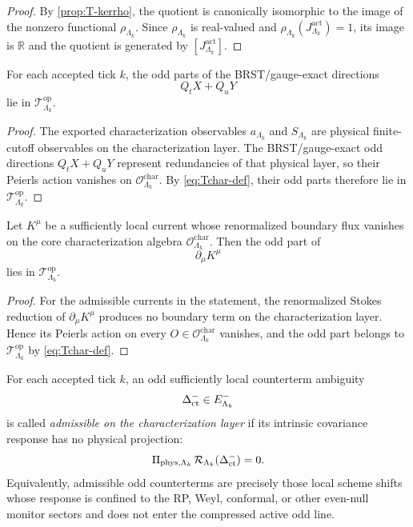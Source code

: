 \documentclass[11pt]{article}
\begin{document}
\begin{proof}
By \cref{prop:T-kerrho}, the quotient is canonically isomorphic to the image of the nonzero
functional \(\rho_{\Lambda_k}\). Since \(\rho_{\Lambda_k}\) is real-valued and
\(\rho_{\Lambda_k}(J^{\mathrm{act}}_{\Lambda_k})=1\), its image is \(\mathbb R\) and the quotient
is generated by \([J^{\mathrm{act}}_{\Lambda_k}]\).
\end{proof}

\begin{proposition}
\label{prop:ambiguity-brst-char}
For each accepted tick \(k\), the odd parts of the BRST/gauge-exact directions
\[
Q_tX+Q_uY
\]
lie in \(\mathcal T^{\mathrm{op}}_{\Lambda_k}\).
\end{proposition}

\begin{proof}
The exported characterization observables \(a_{\Lambda_k}\) and \(S_{\Lambda_k}\) are physical
finite-cutoff observables on the characterization layer. The BRST/gauge-exact odd directions
\(Q_tX+Q_uY\) represent redundancies of that physical layer, so their Peierls action vanishes on
\(\mathcal O^{\mathrm{char}}_{\Lambda_k}\). By \eqref{eq:Tchar-def}, their odd parts therefore lie
in \(\mathcal T^{\mathrm{op}}_{\Lambda_k}\).
\end{proof}

\begin{proposition}
\label{prop:ambiguity-div-char}
Let \(K^\mu\) be a sufficiently local current whose renormalized boundary flux vanishes on the core
characterization algebra \(\mathcal O^{\mathrm{char}}_{\Lambda_k}\). Then the odd part of
\[
\partial_\mu K^\mu
\]
lies in \(\mathcal T^{\mathrm{op}}_{\Lambda_k}\).
\end{proposition}

\begin{proof}
For the admissible currents in the statement, the renormalized Stokes reduction of
\(\partial_\mu K^\mu\) produces no boundary term on the characterization layer. Hence its Peierls
action on every \(O\in\mathcal O^{\mathrm{char}}_{\Lambda_k}\) vanishes, and the odd part belongs
to \(\mathcal T^{\mathrm{op}}_{\Lambda_k}\) by \eqref{eq:Tchar-def}.
\end{proof}

\begin{definition}
\label{def:ambiguity-ct-char}
For each accepted tick \(k\), an odd sufficiently local counterterm ambiguity
\[
\Delta_{\rm ct}^{-}\in E^-_{\Lambda_k}
\]
is called \emph{admissible on the characterization layer} if its intrinsic covariance response has
no physical projection:
\[
\Pi_{\mathrm{phys},\Lambda_k}\,\mathcal R_{\Lambda_k}(\Delta_{\rm ct}^{-})=0.
\]
Equivalently, admissible odd counterterms are precisely those local scheme shifts whose response is
confined to the RP, Weyl, conformal, or other even-null monitor sectors and does not enter the
compressed active odd line.
\end{definition}
\end{document}
